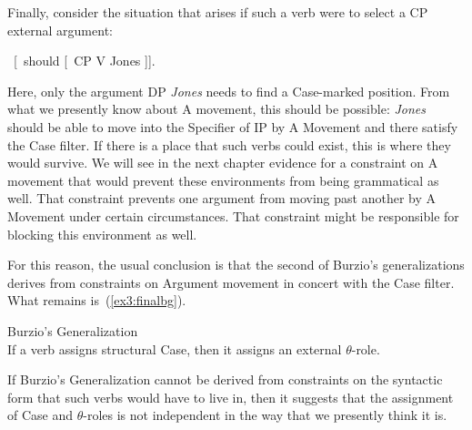 Finally, consider the situation that arises if such a verb were to select a CP external argument:
\begin{exe}
	\ex \label{ex3:bgder4} \ [\IP\ should [\VP\  CP V Jones ]].
\end{exe}
Here, only the argument DP \emph{Jones} needs to find a Case-marked position. From what we presently know about A movement, this should be possible: \emph{Jones} should be able to move into the Specifier of IP by A Movement and there satisfy the Case filter. If there is a place that such verbs could exist, this is where they would survive. We will see in the next chapter evidence for a constraint on A movement that would prevent these environments from being grammatical as well. That constraint prevents one argument from moving past another by A Movement under certain circumstances. That constraint might be responsible for blocking this environment as well.

For this reason, the usual conclusion is that the second of Burzio's generalizations derives from constraints on Argument movement in concert with the Case filter. What remains is~(\ref{ex3:finalbg}).
\begin{exe}
\ex \label{ex3:finalbg} Burzio's Generalization\\
If a verb assigns structural Case, then it assigns an external \mbox{$\theta$-role}.
\end{exe}
If Burzio's Generalization cannot be derived from constraints on the syntactic form that such verbs would have to live in, then it suggests that the assignment of Case and \mbox{$\theta$-roles} is not independent in the way that we presently think it is.

